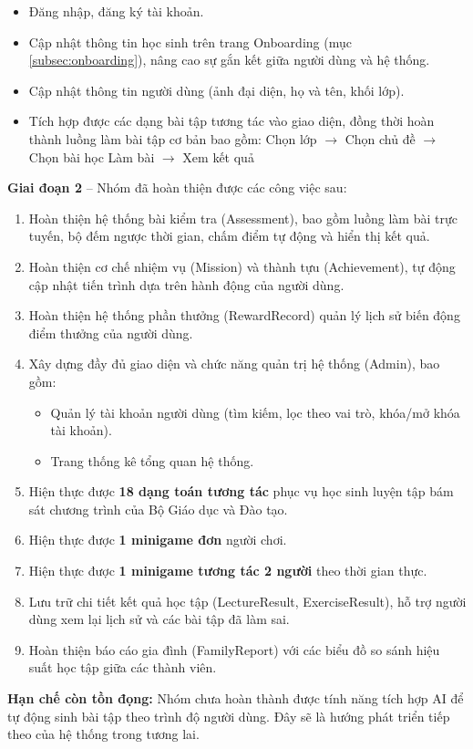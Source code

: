 \begin{enumerate}
	\begin{itemize}
		\item Đăng nhập, đăng ký tài khoản.
		\item Cập nhật thông tin học sinh trên trang Onboarding (mục \ref{subsec:onboarding}), nâng cao sự gắn kết giữa người dùng và hệ thống.
		\item Cập nhật thông tin người dùng (ảnh đại diện, họ và tên, khối lớp).
		\item Tích hợp được các dạng bài tập tương tác vào giao diện, đồng thời hoàn thành luồng làm bài tập cơ bản bao gồm: 
		\newline 
		Chọn lớp $\rightarrow$ Chọn chủ đề $\rightarrow$ Chọn bài học Làm bài $\rightarrow$ Xem kết quả
	\end{itemize}
\end{enumerate}

\vspace{0.2cm}
\noindent\textbf{Giai đoạn 2} -- Nhóm đã hoàn thiện được các công việc sau:
\begin{enumerate}
	\item Hoàn thiện hệ thống bài kiểm tra (Assessment), bao gồm luồng làm bài trực tuyến, bộ đếm ngược thời gian, chấm điểm tự động và hiển thị kết quả.
	\item Hoàn thiện cơ chế nhiệm vụ (Mission) và thành tựu (Achievement), tự động cập nhật tiến trình dựa trên hành động của người dùng.
	\item Hoàn thiện hệ thống phần thưởng (RewardRecord) quản lý lịch sử biến động điểm thưởng của người dùng.
	\item Xây dựng đầy đủ giao diện và chức năng quản trị hệ thống (Admin), bao gồm:
	\begin{itemize}
		\item Quản lý tài khoản người dùng (tìm kiếm, lọc theo vai trò, khóa/mở khóa tài khoản).
		\item Trang thống kê tổng quan hệ thống.
	\end{itemize}
	\item Hiện thực được \textbf{18 dạng toán tương tác} phục vụ học sinh luyện tập bám sát chương trình của Bộ Giáo dục và Đào tạo.
	\item Hiện thực được \textbf{1 minigame đơn}  người chơi.
	\item Hiện thực được \textbf{1 minigame tương tác 2 người} theo thời gian thực.
	\item Lưu trữ chi tiết kết quả học tập (LectureResult, ExerciseResult), hỗ trợ người dùng xem lại lịch sử và các bài tập đã làm sai.
	\item Hoàn thiện báo cáo gia đình (FamilyReport) với các biểu đồ so sánh hiệu suất học tập giữa các thành viên.
\end{enumerate}

\vspace{0.3cm}
\noindent\textbf{Hạn chế còn tồn đọng:} Nhóm chưa hoàn thành được tính năng tích hợp AI để tự động sinh bài tập theo trình độ người dùng. Đây sẽ là hướng phát triển tiếp theo của hệ thống trong tương lai.
